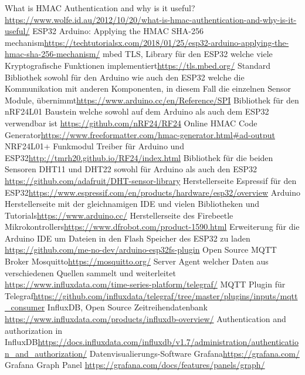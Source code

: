 \documentclass[
  12pt, %
  a4paper, %
  twoside, %
  openany, %
  numbers=noenddot, %
  BCOR=5mm, %
  parskip=half*, %
  thesis, %
]{bfhbook}
\begin{document}
\renewcommand\bibname{Linkverzeichnis}
\begin{thebibliography}{99}\label{links}
   What is HMAC Authentication and why is it useful?\break \url{https://www.wolfe.id.au/2012/10/20/what-is-hmac-authentication-and-why-is-it-useful/}
    ESP32 Arduino: Applying the HMAC SHA-256 mechanism\break \url{https://techtutorialsx.com/2018/01/25/esp32-arduino-applying-the-hmac-sha-256-mechanism/}
     mbed TLS, Library für den ESP32 welche viele Kryptografische Funktionen implementiert\break \url{https://tls.mbed.org/}
     Standard Bibliothek sowohl für den Arduino wie auch den ESP32 welche die Kommunikation mit anderen Komponenten, in diesem Fall die einzelnen Sensor Module, übernimmt\break \url{https://www.arduino.cc/en/Reference/SPI}
     Bibliothek für den nRF24L01 Baustein welche sowohl auf dem Arduino als auch dem ESP32 verwendbar ist \break \url{https://github.com/nRF24/RF24}
    Online HMAC Code Generator\break \url{https://www.freeformatter.com/hmac-generator.html#ad-output}
    NRF24L01+ Funkmodul Treiber für Arduino und ESP32\break \url{http://tmrh20.github.io/RF24/index.html}
     Bibliothek für die beiden Sensoren DHT11 und DHT22 sowohl für Arduino als auch den ESP32 \break \url{https://github.com/adafruit/DHT-sensor-library}
    Herstellerseite Espressif für den ESP32\break \url{https://www.espressif.com/en/products/hardware/esp32/overview}
    Arduino Herstellerseite mit der gleichnamigen IDE und vielen Bibliotheken und Tutorials\break \url{https://www.arduino.cc/}
    Herstellerseite des Firebeetle Mikrokontrollers\break \url{https://www.dfrobot.com/product-1590.html}
    Erweiterung für die Arduino IDE um Dateien in den Flash Speicher des ESP32 zu laden \break \url{https://github.com/me-no-dev/arduino-esp32fs-plugin}
    Open Source MQTT Broker Mosquitto\break \url{https://mosquitto.org/}
     Server Agent welcher Daten aus verschiedenen Quellen sammelt und weiterleitet \break \url{https://www.influxdata.com/time-series-platform/telegraf/}
    MQTT Plugin für Telegraf\break \url{https://github.com/influxdata/telegraf/tree/master/plugins/inputs/mqtt_consumer}
     InfluxDB, Open Source Zeitreihendatenbank \break \url{https://www.influxdata.com/products/influxdb-overview/}
    Authentication and authorization in InfluxDB\break \url{https://docs.influxdata.com/influxdb/v1.7/administration/authentication_and_authorization/}
     Datenvisualierungs-Software Grafana\break \url{https://grafana.com/}
    Grafana Graph Panel \break \url{https://grafana.com/docs/features/panels/graph/}
  \end{thebibliography}
\end{document}

